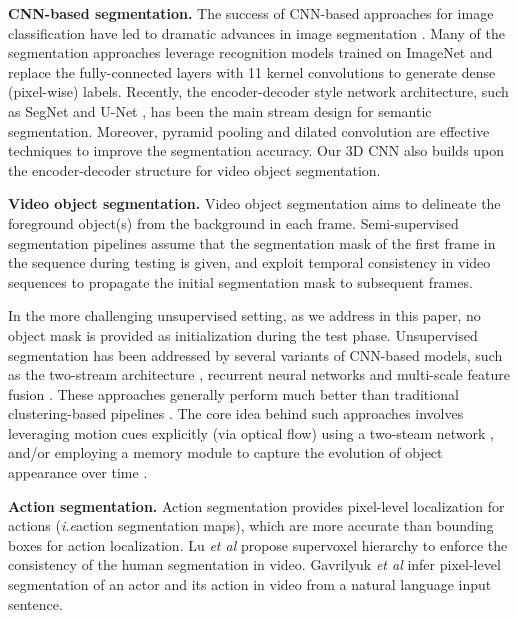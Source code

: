 \documentclass{bmvc2k}
\def\etal{\emph{et al}\bmvaOneDot}
\def\ie{\emph{i.e}\bmvaOneDot}
\begin{document}
\textbf{CNN-based segmentation.} The success of CNN-based approaches for image classification \cite{krizhevsky2012imagenet, he2016deep} have led to dramatic advances in image segmentation \cite{long2015fully, noh2015learning}. Many of the segmentation approaches leverage recognition models trained on ImageNet and replace the fully-connected layers with 11 kernel convolutions to generate dense (pixel-wise) labels. Recently, the encoder-decoder style network architecture, such as SegNet \cite{badrinarayanan2015segnet} and U-Net \cite{ronneberger2015u}, has been the main stream design for semantic segmentation. Moreover, pyramid pooling \cite{zhao2017pyramid, chen2017rethinking} and dilated convolution \cite{yu2015multi, chen2017rethinking, chen2018deeplab} are effective techniques to improve the segmentation accuracy. Our 3D CNN also builds upon the encoder-decoder structure for video object segmentation. 

\textbf{Video object segmentation.} Video object segmentation \cite{ke2007event, yan2008learning} aims to delineate the foreground object(s) from the background in each frame. Semi-supervised segmentation pipelines \cite{Maninis2018Video,Voigtlaender2017Online} assume that the segmentation mask of the first frame in the sequence during testing is given, 
and exploit temporal consistency in video sequences to propagate the initial segmentation mask to subsequent frames.

In the more challenging unsupervised setting, as we address in this paper, no object mask is provided as initialization during the test phase.
Unsupervised segmentation has been addressed by several variants of CNN-based models, such as the two-stream architecture \cite{khoreva2016learning,caelles2017one}, recurrent neural networks \cite{Song_2018_ECCV, tokmakov2017learning} and multi-scale feature fusion \cite{tokmakov2016learning, Song_2018_ECCV}. These approaches generally perform much better than traditional clustering-based pipelines \cite{Chang2013A}. The core idea behind such approaches involves leveraging motion cues explicitly (via optical flow) using a two-steam network \cite{jain2017fusionseg,tokmakov2016learning,tokmakov2017learning}, and/or employing a memory module to capture the evolution of object appearance over time \cite{Song_2018_ECCV,tokmakov2017learning}.


\textbf{Action segmentation.} Action segmentation provides pixel-level localization for actions (\ie action segmentation maps), which are more accurate than bounding boxes for action localization. Lu \etal \cite{lu2015human} propose supervoxel hierarchy to enforce the consistency of the human segmentation in video. Gavrilyuk \etal \cite{gavrilyuk2018actor} infer pixel-level segmentation of an actor and its action in video from a
natural language input sentence. 
\end{document}
